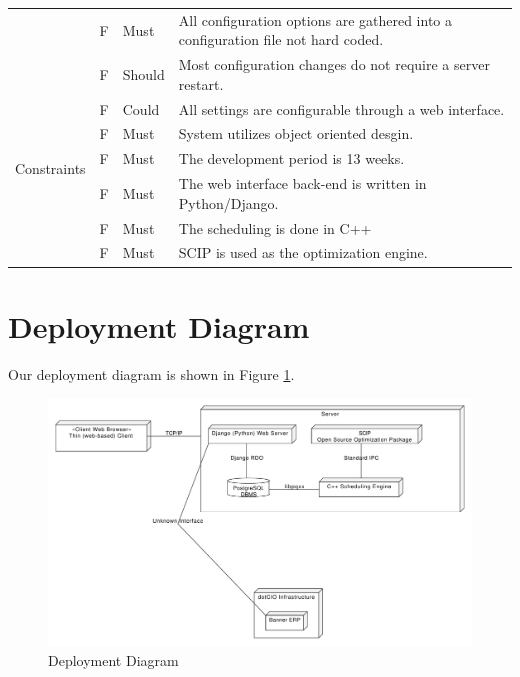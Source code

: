 \documentclass[11pt]{article}
\newcounter{id}
\newcommand{\specid}{\arabic{id}\stepcounter{id}}
\begin{document}
\begin{longtable}{|m{1in}|m{0.3in}|m{0.6in}|m{4.5in}|}
\pagebreak
\multirow{3}{*}{Configurability}
 & F\specid & Must
 & All configuration options are gathered into a configuration file not hard coded. \\*  \cline{2-4}
 &F\specid & Should
 & Most configuration changes do not require a server restart. \\* \cline{2-4}
 & F\specid & Could
 & All settings are configurable through a web interface. \\* \hline
 \multirow{3}{*}{Constraints}
 &F\specid & Must
 &  System utilizes object oriented desgin.\\* \cline{2-4}
 &F\specid & Must
 &  The development period is 13 weeks.\\* \cline{2-4}
 &F\specid & Must
 &  The web interface back-end is written in Python/Django.\\* \cline{2-4}
 &F\specid & Must
 &  The scheduling is done in C++\\* \cline{2-4}
 &F\specid & Must
 &  SCIP is used as the optimization engine.\\*
\end{longtable}

\section{Deployment Diagram} %

Our deployment diagram is shown in Figure \ref{fig:Deploy}.

\begin{figure}[ht]
	\centering
		\includegraphics[width = \textwidth]{deploymentdiagram.pdf}
	\caption{Deployment Diagram}
	\label{fig:Deploy}
\end{figure}
\end{document}
